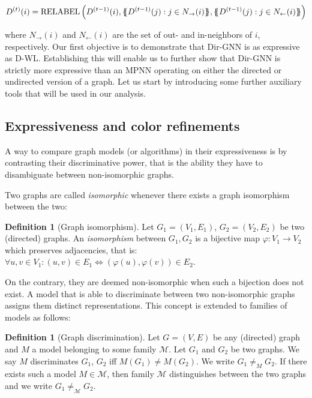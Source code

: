\documentclass{article}
\newcommand{\inp}{\leftarrow}
\newcommand{\out}{\rightarrow}
\newcommand\oursacro{Dir-GNN}
\newcommand*{\ldblbrace}{\{\mskip-6mu\{}
\newcommand*{\rdblbrace}{\}\mskip-6mu\}}
\theoremstyle{plain}
\theoremstyle{definition}
\newtheorem{definition}[theorem]{Definition}
\theoremstyle{remark}
\begin{document}
\begin{equation}
D^{(t)}(i) = \mathrm{RELABEL}\left( D^{(t-1)}(i), \ldblbrace D^{(t-1)}(j) : j \in N_\out(i) \rdblbrace, \ldblbrace D^{(t-1)}(j) : j \in N_\inp(i) \rdblbrace \right)
\end{equation}

where $N_\out(i)$ and $N_\inp(i)$ are the set of out- and in-neighbors of $i$, respectively. Our first objective is to demonstrate that \oursacro{} is as expressive as D-WL. Establishing this will enable us to further show that \oursacro{} is strictly more expressive than an MPNN operating on either the directed or undirected version of a graph. Let us start by introducing some further auxiliary tools that will be used in our analysis.

\subsection{Expressiveness and color refinements}

A way to compare graph models (or algorithms) in their expressiveness is by contrasting their discriminative power, that is the ability they have to disambiguate between non-isomorphic graphs.

Two graphs are called \emph{isomorphic} whenever there exists a graph isomorphism between the two:
\begin{definition}[Graph isomorphism]\label{def:isomorphism}
    Let $G_1 = (V_1, E_1)$, $G_2 = (V_2, E_2)$ be two (directed) graphs. An \emph{isomorphism} between $G_1, G_2$ is a bijective map $\varphi: V_1 \rightarrow V_2$ which preserves adjacencies, that is: $\forall u, v \in V_1: (u, v) \in E_1 \Longleftrightarrow (\varphi(u), \varphi(v)) \in E_2$. 
\end{definition}
\noindent On the contrary, they are deemed non-isomorphic when such a bijection does not exist. A model that is able to discriminate between two non-isomorphic graphs assigns them distinct representations. This concept is extended to families of models as follows:
\begin{definition}[Graph discrimination]
    Let $G = (V, E)$ be any (directed) graph and $M$ a model belonging to some family $\mathcal{M}$. 
    Let $G_1$ and $G_2$ be two graphs. We say $M$ discriminates $G_1$, $G_2$ iff $M(G_1) \neq M(G_2)$. 
    We write $G_1 \neq_M G_2$. If there exists such a model $M \in \mathcal{M}$, then family $\mathcal{M}$ distinguishes between the two graphs and we write $G_1 \neq_{\mathcal{M}} G_2$. 
\end{definition}
\end{document}
